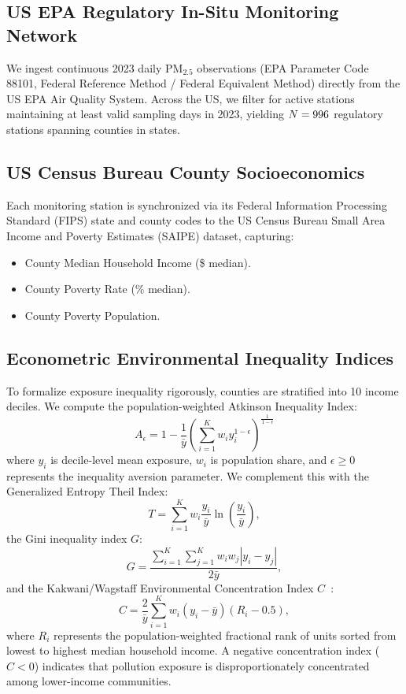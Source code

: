 \documentclass[conference]{IEEEtran}
\begin{document}
\subsection{US EPA Regulatory In-Situ Monitoring Network}
We ingest continuous 2023 daily $\mathrm{PM}_{2.5}$ observations (EPA Parameter Code 88101, Federal Reference Method / Federal Equivalent Method) directly from the US EPA Air Quality System. Across the US, we filter for active stations maintaining at least \minValidDays{} valid sampling days in 2023, yielding $N = 996{}$ regulatory stations spanning \numCounties{} counties in \numStates{} states.

\subsection{US Census Bureau County Socioeconomics}
Each monitoring station is synchronized via its Federal Information Processing Standard (FIPS) state and county codes to the US Census Bureau Small Area Income and Poverty Estimates (SAIPE) dataset, capturing:
\begin{itemize}
    \item County Median Household Income (\$\medianCountyIncome{} median).
    \item County Poverty Rate (\medianCountyPoverty{}\% median).
    \item County Poverty Population.
\end{itemize}

\subsection{Econometric Environmental Inequality Indices}
To formalize exposure inequality rigorously, counties are stratified into 10 income deciles. We compute the population-weighted Atkinson Inequality Index:
\begin{equation}
A_\epsilon = 1 - \frac{1}{\bar{y}} \left( \sum_{i=1}^K w_i y_i^{1 - \epsilon} \right)^{\frac{1}{1 - \epsilon}}
\end{equation}
where $y_i$ is decile-level mean exposure, $w_i$ is population share, and $\epsilon \ge 0$ represents the inequality aversion parameter. We complement this with the Generalized Entropy Theil Index:
\begin{equation}
T = \sum_{i=1}^K w_i \frac{y_i}{\bar{y}} \ln\left( \frac{y_i}{\bar{y}} \right),
\end{equation}
the Gini inequality index $G$:
\begin{equation}
G = \frac{\sum_{i=1}^K \sum_{j=1}^K w_i w_j |y_i - y_j|}{2 \bar{y}},
\end{equation}
and the Kakwani/Wagstaff Environmental Concentration Index $C$~\cite{wagstaff1991}:
\begin{equation}
C = \frac{2}{\bar{y}} \sum_{i=1}^K w_i (y_i - \bar{y})(R_i - 0.5),
\end{equation}
where $R_i$ represents the population-weighted fractional rank of units sorted from lowest to highest median household income. A negative concentration index ($C < 0$) indicates that pollution exposure is disproportionately concentrated among lower-income communities.
\end{document}
